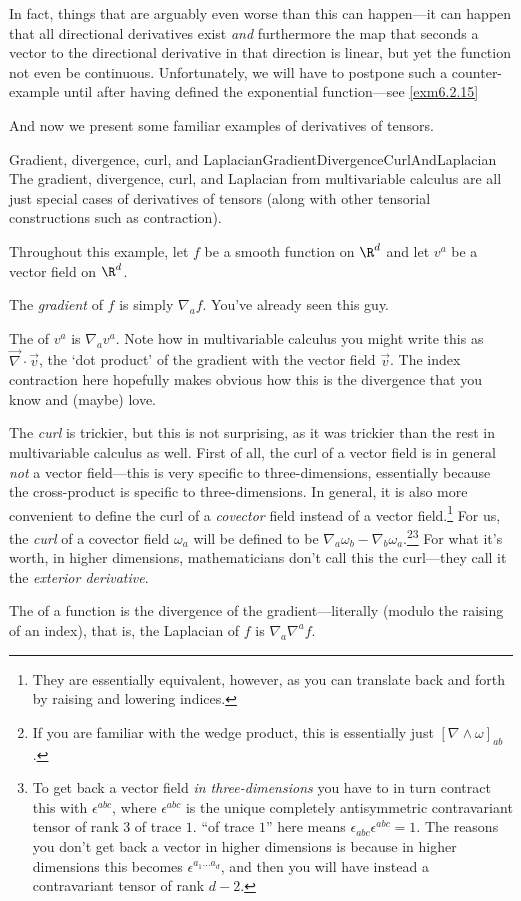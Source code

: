 In fact, things that are arguably even worse than this can happen---it can happen that all directional derivatives exist \emph{and} furthermore the map that seconds a vector to the directional derivative in that direction is linear, but yet the function not even be continuous.  Unfortunately, we will have to postpone such a counter-example until after having defined the exponential function---see \cref{exm6.2.15}

And now we present some familiar examples of derivatives of tensors.
\begin{exm}{Gradient, divergence, curl, and Laplacian}{GradientDivergenceCurlAndLaplacian}
The gradient, divergence, curl, and Laplacian from multivariable calculus are all just special cases of derivatives of tensors (along with other tensorial constructions such as contraction).

Throughout this example, let $f$ be a smooth function on $\R ^d$ and let $v^a$ be a vector field on $\R ^d$. 

The \emph{gradient} of $f$ is simply $\nabla _af$.  You've already seen this guy.

The  of $v^a$ is $\nabla _av^a$.  Note how in multivariable calculus you might write this as $\vec{\nabla}\cdot \vec{v}$, the `dot product' of the gradient with the vector field $\vec{v}$.  The index contraction here hopefully makes obvious how this is the divergence that you know and (maybe) love.

The \emph{curl} is trickier, but this is not surprising, as it was trickier than the rest in multivariable calculus as well.  First of all, the curl of a vector field is in general \emph{not} a vector field---this is very specific to three-dimensions, essentially because the cross-product is specific to three-dimensions.  In general, it is also more convenient to define the curl of a \emph{covector} field instead of a vector field.\footnote{They are essentially equivalent, however, as you can translate back and forth by raising and lowering indices.}  For us, the \emph{curl} of a covector field $\omega _a$ will be defined to be $\nabla _a\omega _b-\nabla _b\omega _a$.\footnote{If you are familiar with the wedge product, this is essentially just $[\nabla \wedge \omega ]_{ab}$.}\footnote{To get back a vector field \emph{in three-dimensions} you have to in turn contract this with $\epsilon ^{abc}$, where $\epsilon ^{abc}$ is the unique completely antisymmetric contravariant tensor of rank $3$ of trace $1$.  ``of trace $1$'' here means $\epsilon _{abc}\epsilon ^{abc}=1$.  The reasons you don't get back a vector in higher dimensions is because in higher dimensions this becomes $\epsilon ^{a_1\ldots a_d}$, and then you will have instead a contravariant tensor of rank $d-2$.}  For what it's worth, in higher dimensions, mathematicians don't call this the curl---they call it the \emph{exterior derivative}.

The  of a function is the divergence of the gradient---literally (modulo the raising of an index), that is, the Laplacian of $f$ is $\nabla _a\nabla ^af$.
\end{exm}

